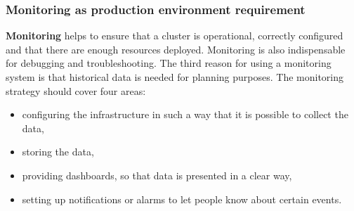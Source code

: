 \subsubsection{Monitoring as production environment requirement}
\textbf{Monitoring} helps to ensure that a cluster is operational, correctly configured and that there are enough resources deployed. Monitoring is also indispensable for debugging and troubleshooting\cite{book-mastering-k8s}. The third reason for using a monitoring system is that historical data is needed for planning purposes. The monitoring strategy should cover four areas\cite{book-cicd}:
\begin{itemize}
\item configuring the infrastructure in such a way that it is possible to collect the data,
\item storing the data,
\item providing dashboards, so that data is presented in a clear way,
\item setting up notifications or alarms to let people know about certain events.
\end{itemize}
